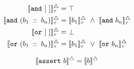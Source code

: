 \begin{align}
    \llbracket \text{\texttt{and}}~[~]\rrbracket_{\tau}^{\triangle} &= \top \\
    \llbracket \text{\texttt{and}}~(b_1~\mathbin{::}~b_n)\rrbracket_{\tau}^{\triangle} &= \llbracket b_1 \rrbracket_{\tau}^{\triangle}~\land~\llbracket \text{\texttt{and}}~b_n \rrbracket_{\tau}^{\triangle}\\
    \llbracket \text{\texttt{or}}~[~]\rrbracket_{\tau}^{\triangle} &= \bot \\
    \llbracket \text{\texttt{or}}~(b_1~\mathbin{::}~b_n)\rrbracket_{\tau}^{\triangle} &= \llbracket b_1 \rrbracket_{\tau}^{\triangle}~\lor~\llbracket \text{\texttt{or}}~b_n \rrbracket_{\tau}^{\triangle}
\end{align}

\begin{align}
    \llbracket \text{\texttt{assert}}~b\rrbracket^{\triangle} &= \llbracket b \rrbracket^{\triangle} \\
\end{align}